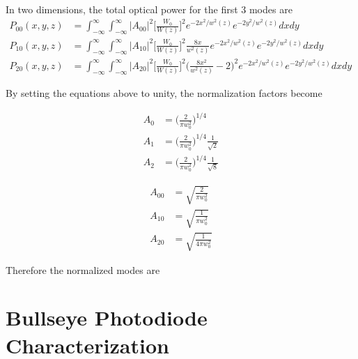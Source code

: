\documentclass[oneside]{book}
\begin{document}
\begin{appendices}
	In two dimensions, the total optical power for the first 3 modes are
	\begin{equation}
	\label{HGNormalInt2D}
	\begin{aligned}
		P_{00}(x,y,z) 	& 	=	 \int_{-\infty}^{\infty} \int_{-\infty}^{\infty}  \vert A_{00} \vert^2   \bigg[ \frac{W_0}{W(z)} \bigg]^2 e^{-2x^2/w^2(z)}e^{-2y^2/w^2(z)} dx dy&
	\\	P_{10}(x,y,z)	&	=	\int_{-\infty}^{\infty} \int_{-\infty}^{\infty}  \vert A_{10} \vert^2  \bigg[ \frac{W_0}{W(z)} \bigg]^2 \frac{8x}{w^2(z)} e^{-2x^2/w^2(z)}e^{-2y^2/w^2(z)} dx dy&
	\\	P_{20}(x,y,z)	&	= 	\int_{-\infty}^{\infty} \int_{-\infty}^{\infty}  \vert A_{20} \vert^2   \bigg[ \frac{W_0}{W(z)} \bigg]^2 \bigg(\frac{8x^2}{w^2(z)} - 2\bigg)^2 e^{-2x^2/w^2(z)}e^{-2y^2/w^2(z)} dx dy
	\end{aligned}
	\end{equation}
	
	By setting the equations above to unity, the normalization factors become
	
	\begin{equation}
	\begin{aligned}
		A_{0} &	= \bigg( \frac{2}{\pi w_0^2} \bigg)^{1/4} 
	\\	A_{1} &	= \bigg( \frac{2}{\pi w_0^2} \bigg)^{1/4} \frac{1}{\sqrt{2}}
	\\	A_{2} &	= \bigg( \frac{2}{\pi w_0^2} \bigg)^{1/4} \frac{1}{\sqrt{8}}
	\end{aligned}
	\end{equation}
	
	\begin{equation}
	\begin{aligned}
		A_{00} &	= \sqrt{\frac{2}{\pi w_0^2}}
	\\	A_{10} &	= \sqrt{\frac{1}{\pi w_0^2}}
	\\	A_{20} &	= \sqrt{\frac{1}{4\pi w_0^2}}
	\end{aligned}
	\end{equation}
	
	Therefore the normalized modes are
	
	
	
	


	
	

	
	
	
	\chapter{Bullseye Photodiode Characterization}
	

\end{appendices}
\end{document}
